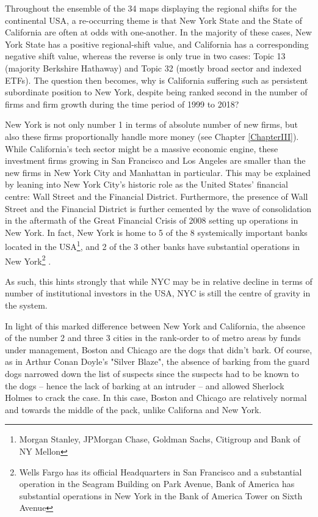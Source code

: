 Throughout the ensemble of the 34 maps displaying the regional shifts for the continental USA, a re-occurring theme is that New York State and the State of California are often at odds with one-another. In the majority of these cases, New York State has a positive regional-shift value, and California has a corresponding negative shift value, whereas the reverse is only true in two cases: Topic 13 (majority Berkshire Hathaway) and Topic 32 (mostly broad sector and indexed ETFs).   The question then becomes, why is California suffering such as persistent subordinate position to New York, despite being ranked second in the number of firms and firm growth during the time period of 1999 to 2018?  

New York is not only number 1 in terms of absolute number of new firms, but also these firms proportionally handle more money (see Chapter \ref{ChapterIII}).  While California's tech sector might be a massive economic engine, these investment firms growing in San Francisco and Los Angeles are smaller than the new firms in New York City and Manhattan in particular. This may be explained by leaning into New York City's historic role as the United States' financial centre: Wall Street and the Financial District.  Furthermore, the presence of Wall Street and the Financial District is further cemented by the wave of consolidation in the aftermath of the Great Financial Crisis of 2008 setting up operations in New York. In fact, New York is home to 5 of the 8 systemically important banks located in the USA\footnote{Morgan Stanley, JPMorgan Chase, Goldman Sachs, Citigroup and Bank of NY Mellon}, and 2 of the 3 other banks have substantial operations in New York\footnote{Wells Fargo has its official Headquarters in San Francisco and a substantial operation in the Seagram Building on Park Avenue,  Bank of America has substantial operations in New York in the Bank of America Tower on Sixth Avenue} \citep{FSB2019}. 

As such, this hints strongly that while NYC may be in relative decline in terms of number of institutional investors in the USA, NYC is still the centre of gravity in the system.  

In light of this marked difference between New York and California, the absence of the number 2 and three 3 cities in the rank-order to of metro areas by funds under management, Boston and Chicago are the dogs that didn't bark.  Of course, as in Arthur Conan Doyle's "Silver Blaze", the absence of barking from the guard dogs narrowed down the list of suspects since the suspects had to be known to the dogs -- hence the lack of barking at an intruder -- and allowed Sherlock Holmes to crack the case.  In this case, Boston and Chicago are relatively normal and towards the middle of the pack, unlike Californa and New York. 




